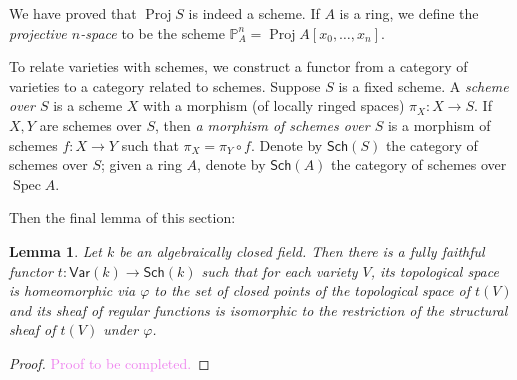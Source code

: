 \documentclass[12pt]{article}
\newtheorem{lemma}{Lemma}[subsection]
\theoremstyle{remark}
\newcommand{\Spec}[0]{\operatorname{Spec}}
\newcommand{\Proj}[0]{\operatorname{Proj}}
\newcommand{\Sch}[0]{\mathsf{Sch}}
\begin{document}
	We have proved that $\Proj S$ is indeed a scheme. If $A$ is a ring, we define the \textit{projective $n$-space} to be the scheme $\mathbb P^n_A=\Proj A[x_0,\dots, x_n]$.

	To relate varieties with schemes, we construct a functor from a category of varieties to a category related to schemes. Suppose $S$ is a fixed scheme. A \textit{scheme over $S$} is a scheme $X$ with a morphism (of locally ringed spaces) $\pi_X:X\to S$. If $X, Y$ are schemes over $S$, then \textit{a morphism of schemes over $S$} is a morphism of schemes $f:X\to Y$ such that $\pi_X=\pi_Y\circ f$. Denote by $\Sch(S)$ the category of schemes over $S$; given a ring $A$, denote by $\Sch(A)$ the category of schemes over $\Spec A$.

	Then the final lemma of this section:
	\begin{lemma}\label{l272}
		Let $k$ be an algebraically closed field. Then there is a fully faithful functor $t:\mathsf{Var}(k)\to\Sch(k)$ such that for each variety $V$, its topological space is homeomorphic via $\varphi$ to the set of closed points of the topological space of $t(V)$ and its sheaf of regular functions is isomorphic to the restriction of the structural sheaf of $t(V)$ under $\varphi$.
	\end{lemma}
	\begin{proof}
	\textcolor{violet}{Proof to be completed.}
	\end{proof}
\end{document}
